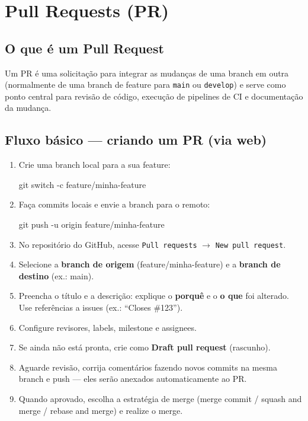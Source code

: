 \section{Pull Requests (PR)}

\subsection{O que é um Pull Request}
Um PR é uma solicitação para integrar as mudanças de uma branch em outra (normalmente de uma branch de feature para \texttt{main} ou \texttt{develop}) e serve como ponto central para revisão de código, execução de pipelines de CI e documentação da mudança.

\subsection{Fluxo básico — criando um PR (via web)}
\begin{enumerate}
  \item Crie uma branch local para a sua feature:
  \begin{bashcode}
  git switch -c feature/minha-feature
  \end{bashcode}
  \item Faça commits locais e envie a branch para o remoto:
  \begin{bashcode}
  git push -u origin feature/minha-feature
  \end{bashcode}
  \item No repositório do GitHub, acesse \texttt{Pull requests} \(\rightarrow\) \texttt{New pull request}.
  \item Selecione a \textbf{branch de origem} (feature/minha-feature) e a \textbf{branch de destino} (ex.: main).
  \item Preencha o título e a descrição: explique o \textbf{porquê} e o \textbf{o que} foi alterado. Use referências a issues (ex.: ``Closes \#123'').
  \item Configure revisores, labels, milestone e assignees.
  \item Se ainda não está pronta, crie como \textbf{Draft pull request} (rascunho).
  \item Aguarde revisão, corrija comentários fazendo novos commits na mesma branch e push — eles serão anexados automaticamente ao PR.
  \item Quando aprovado, escolha a estratégia de merge (merge commit / squash and merge / rebase and merge) e realize o merge.
\end{enumerate}

